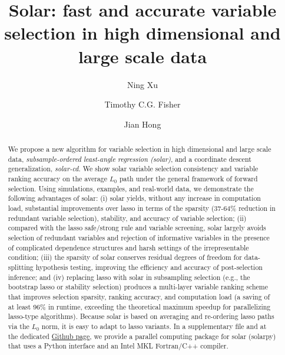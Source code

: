 \documentclass[11pt,review,authoryear]{elsarticle}
\begin{document}
\title{Solar: fast and accurate variable selection in high dimensional and large scale data}

\author{Ning Xu}
\address{School of Economics, University of Sydney, Australia}

\author{Timothy C.G. Fisher}
\address{School of Economics, University of Sydney, Australia}

\author{Jian Hong}
\address{School of Economics, University of Sydney, Australia}


\begin{abstract}
  We propose a new algorithm for variable selection in high dimensional and large scale data, \emph{subsample-ordered least-angle regression (solar)}, and a coordinate descent generalization, \emph{solar-cd}. We show solar variable selection consistency and variable ranking accuracy on the average $L_0$ path under the general framework of forward selection. Using simulations, examples, and real-world data, we demonstrate the following advantages of solar: (i) solar yields, without any increase in computation load, substantial improvements over lasso in terms of the sparsity (37-64\% reduction in redundant variable selection), stability, and accuracy of variable selection; (ii) compared with the lasso safe/strong rule and variable screening, solar largely avoids selection of redundant variables and rejection of informative variables in the presence of complicated dependence structures and harsh settings of the irrepresentable condition; (iii) the sparsity of solar conserves residual degrees of freedom for data-splitting hypothesis testing, improving the efficiency and accuracy of post-selection inference; and (iv) replacing lasso with solar in subsampling selection (e.g., the bootstrap lasso or stability selection) produces a multi-layer variable ranking scheme that improves selection sparsity, ranking accuracy, and computation load (a saving of at least 96\% in runtime, exceeding the theoretical maximum speedup for parallelizing lasso-type algorithms). Because solar is based on averaging and re-ordering lasso paths via the $L_0$ norm, it is easy to adapt to lasso variants. In a supplementary file and at the dedicated \href{https://github.com/isaac2math/solarpy}{Github page}, we provide a parallel computing package for solar (solarpy) that uses a Python interface and an Intel MKL Fortran/C++ compiler.
\end{abstract}
\end{document}
